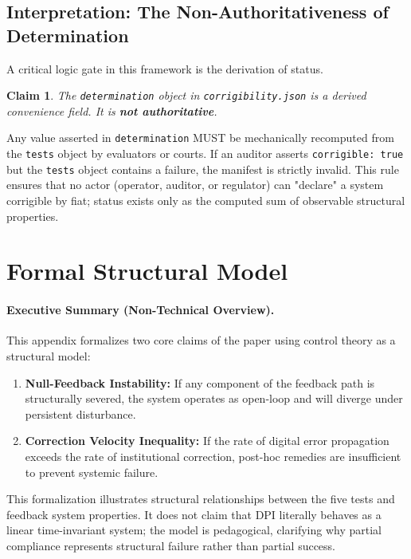 \documentclass{article}
\newtheorem{claim}{Claim}
\begin{document}
\subsection{Interpretation: The Non-Authoritativeness of Determination}

A critical logic gate in this framework is the derivation of status.

\begin{claim}
The \texttt{determination} object in \texttt{corrigibility.json} is a derived convenience field. It is \textbf{not authoritative}.
\end{claim}

Any value asserted in \texttt{determination} MUST be mechanically recomputed from the \texttt{tests} object by evaluators or courts. If an auditor asserts \texttt{corrigible: true} but the \texttt{tests} object contains a failure, the manifest is strictly invalid. This rule ensures that no actor (operator, auditor, or regulator) can "declare" a system corrigible by fiat; status exists only as the computed sum of observable structural properties.

\section{Formal Structural Model}
\label{appendix:proofs}

\paragraph{Executive Summary (Non-Technical Overview).}
This appendix formalizes two core claims of the paper using control theory as a structural model:
\begin{enumerate}[noitemsep]
    \item \textbf{Null-Feedback Instability:} If any component of the feedback path is structurally severed, the system operates as open-loop and will diverge under persistent disturbance.
    \item \textbf{Correction Velocity Inequality:} If the rate of digital error propagation exceeds the rate of institutional correction, post-hoc remedies are insufficient to prevent systemic failure.
\end{enumerate}
This formalization illustrates structural relationships between the five tests and feedback system properties. It does not claim that DPI literally behaves as a linear time-invariant system; the model is pedagogical, clarifying why partial compliance represents structural failure rather than partial success.
\end{document}

